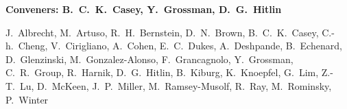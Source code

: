 

\begin{center}

\begin{large} {\bf Conveners: B.~C.~K.~Casey, Y.~Grossman, D.~G.~Hitlin} \end{large}

J.~Albrecht,
M.~Artuso,
R.~H.~Bernstein,
D.~N.~Brown,
B.~C.~K.~Casey,
C.-h.~Cheng,
V.~Cirigliano,
A.~Cohen,
E.~C.~Dukes,
A.~Deshpande,
B.~Echenard,
D.~Glenzinski,
M.~Gonzalez-Alonso,
F.~Grancagnolo,
Y.~Grossman,
C.~R.~Group,
R.~Harnik,
D.~G.~Hitlin, 
B.~Kiburg,
K.~Knoepfel,
G.~Lim,
Z.-T.~Lu,
D.~McKeen,
J.~P.~Miller,
M.~Ramsey-Musolf,
R.~Ray,
M.~Rominsky,
P.~Winter 


\end{center}

